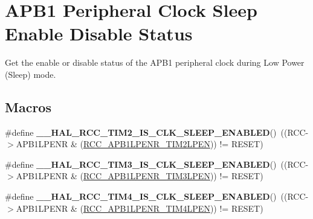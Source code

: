 \hypertarget{group___r_c_c___a_p_b1___clock___sleep___enable___disable___status}{\section{A\-P\-B1 Peripheral Clock Sleep Enable Disable Status}
\label{group___r_c_c___a_p_b1___clock___sleep___enable___disable___status}
}


Get the enable or disable status of the A\-P\-B1 peripheral clock during Low Power (Sleep) mode.  


\subsection*{Macros}
\begin{DoxyCompactItemize}
\item 
\hypertarget{group___r_c_c___a_p_b1___clock___sleep___enable___disable___status_gaf38181befdeecf6a61c03885d3645bf1}{\#define {\bfseries \-\_\-\-\_\-\-H\-A\-L\-\_\-\-R\-C\-C\-\_\-\-T\-I\-M2\-\_\-\-I\-S\-\_\-\-C\-L\-K\-\_\-\-S\-L\-E\-E\-P\-\_\-\-E\-N\-A\-B\-L\-E\-D}()~((R\-C\-C-\/$>$A\-P\-B1\-L\-P\-E\-N\-R \& (\hyperlink{group___peripheral___registers___bits___definition_ga1f561f8bfc556b52335ec2a32ba81c44}{R\-C\-C\-\_\-\-A\-P\-B1\-L\-P\-E\-N\-R\-\_\-\-T\-I\-M2\-L\-P\-E\-N})) != R\-E\-S\-E\-T)}\label{group___r_c_c___a_p_b1___clock___sleep___enable___disable___status_gaf38181befdeecf6a61c03885d3645bf1}

\item 
\hypertarget{group___r_c_c___a_p_b1___clock___sleep___enable___disable___status_gabe8c0a343d9bb288dae09aadbab028a6}{\#define {\bfseries \-\_\-\-\_\-\-H\-A\-L\-\_\-\-R\-C\-C\-\_\-\-T\-I\-M3\-\_\-\-I\-S\-\_\-\-C\-L\-K\-\_\-\-S\-L\-E\-E\-P\-\_\-\-E\-N\-A\-B\-L\-E\-D}()~((R\-C\-C-\/$>$A\-P\-B1\-L\-P\-E\-N\-R \& (\hyperlink{group___peripheral___registers___bits___definition_ga9391d99885a0a6fbaf3447117ac0f7aa}{R\-C\-C\-\_\-\-A\-P\-B1\-L\-P\-E\-N\-R\-\_\-\-T\-I\-M3\-L\-P\-E\-N})) != R\-E\-S\-E\-T)}\label{group___r_c_c___a_p_b1___clock___sleep___enable___disable___status_gabe8c0a343d9bb288dae09aadbab028a6}

\item 
\hypertarget{group___r_c_c___a_p_b1___clock___sleep___enable___disable___status_ga57a6fc55a53a8c9d8cc0303ec5d7177e}{\#define {\bfseries \-\_\-\-\_\-\-H\-A\-L\-\_\-\-R\-C\-C\-\_\-\-T\-I\-M4\-\_\-\-I\-S\-\_\-\-C\-L\-K\-\_\-\-S\-L\-E\-E\-P\-\_\-\-E\-N\-A\-B\-L\-E\-D}()~((R\-C\-C-\/$>$A\-P\-B1\-L\-P\-E\-N\-R \& (\hyperlink{group___peripheral___registers___bits___definition_ga6f04aff278b72fbf6acbe0ad947b06ae}{R\-C\-C\-\_\-\-A\-P\-B1\-L\-P\-E\-N\-R\-\_\-\-T\-I\-M4\-L\-P\-E\-N})) != R\-E\-S\-E\-T)}\label{group___r_c_c___a_p_b1___clock___sleep___enable___disable___status_ga57a6fc55a53a8c9d8cc0303ec5d7177e}


\end{DoxyCompactItemize}
